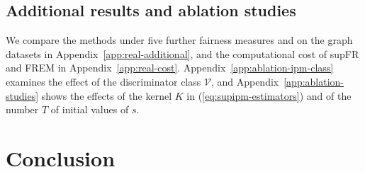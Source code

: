 \documentclass{article} %
\begin{document}

\subsection{Additional results and ablation studies}
We compare the methods under five further fairness measures and on the graph datasets in Appendix~\ref{app:real-additional}, and the computational cost of supFR and FREM in Appendix~\ref{app:real-cost}. Appendix~\ref{app:ablation-ipm-class} examines the effect of the discriminator class $\mathcal{V}$, and Appendix~\ref{app:ablation-studies} shows the effects of the kernel $K$ in (\ref{eq:supipm-estimators}) and of the number $T$ of initial values of $s$.

\section{Conclusion}
\label{sec:conclusion}

\end{document}
